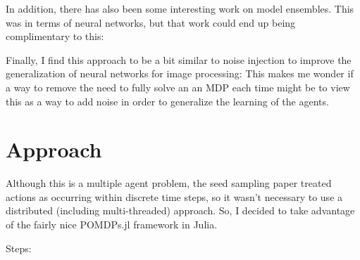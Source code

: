 \documentclass{article}
\begin{document}
In addition, there has also been some interesting work on model ensembles. This was in terms of neural networks, but that work could end up being complimentary to this: \cite{1503.02531}

Finally, I find this approach to be a bit similar to noise injection to improve the generalization of neural networks for image processing: \cite{zur2009noise} This makes me wonder if a way to remove  the need to fully solve an an MDP each time might be to view this as a way to add noise in order to generalize the learning of the agents.

\section{Approach}
Although this is a multiple agent problem, the seed sampling paper treated actions as occurring within discrete time steps, so it wasn't necessary to use a distributed (including multi-threaded) approach. So, I decided to take advantage of the fairly nice POMDPs.jl framework in Julia. 

Steps:
\end{document}
